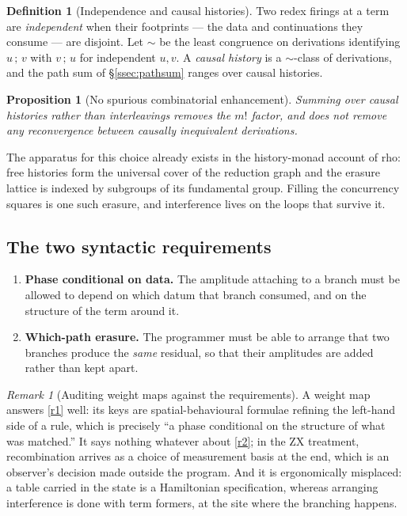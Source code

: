 \documentclass[11pt,a4paper]{article}
\theoremstyle{plain}
\newtheorem{proposition}[theorem]{Proposition}
\theoremstyle{definition}
\newtheorem{definition}[theorem]{Definition}
\theoremstyle{remark}
\newtheorem{remark}[theorem]{Remark}
\begin{document}
\begin{definition}[Independence and causal histories]\label{def:causal}
Two redex firings at a term are \emph{independent} when their footprints ---
the data and continuations they consume --- are disjoint. Let $\sim$ be the least
congruence on derivations identifying $u\,;\,v$ with $v\,;\,u$ for independent
$u,v$. A \emph{causal history} is a $\sim$-class of derivations, and the path sum
of \S\ref{ssec:pathsum} ranges over causal histories.
\end{definition}

\begin{proposition}[No spurious combinatorial enhancement]\label{prop:causal}
Summing over causal histories rather than interleavings removes the $m!$ factor,
and does not remove any reconvergence between causally inequivalent derivations.
\end{proposition}

The apparatus for this choice already exists in the history-monad account of
rho: free histories form the universal cover of the reduction graph and the
erasure lattice is indexed by subgroups of its fundamental group. Filling the
concurrency squares is one such erasure, and interference lives on the loops
that survive it.

\subsection{The two syntactic requirements}

\begin{enumerate}[label=(R\arabic*),leftmargin=2.6em,itemsep=3pt]
\item \label{r1} \textbf{Phase conditional on data.} The amplitude attaching to a
branch must be allowed to depend on which datum that branch consumed, and on the
structure of the term around it.
\item \label{r2} \textbf{Which-path erasure.} The programmer must be able to
arrange that two branches produce the \emph{same} residual, so that their
amplitudes are added rather than kept apart.
\end{enumerate}

\begin{remark}[Auditing weight maps against the requirements]\label{rem:audit}
A weight map answers \ref{r1} well: its keys are spatial-behavioural formulae
refining the left-hand side of a rule, which is precisely ``a phase conditional
on the structure of what was matched.'' It says nothing whatever about \ref{r2};
in the ZX treatment, recombination arrives as a choice of measurement basis at
the end, which is an observer's decision made outside the program. And it is
ergonomically misplaced: a table carried in the state is a Hamiltonian
specification, whereas arranging interference is done with term formers, at the
site where the branching happens.
\end{remark}
\end{document}
